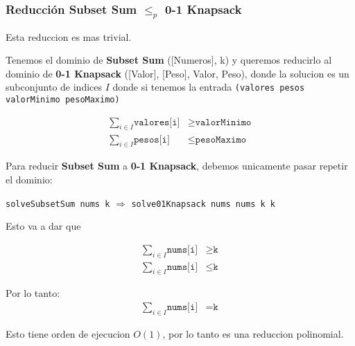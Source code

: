 \subsubsection*{Reducci\'on Subset Sum $\le_{p}$ 0-1 Knapsack}

Esta reduccion es mas trivial. 

Tenemos el dominio de \textbf{Subset Sum} ([Numeros], k) y queremos reducirlo 
al dominio de \textbf{0-1 Knapsack} ([Valor], [Peso], Valor, Peso), donde la solucion 
es un subconjunto de indices $I$ donde si tenemos la entrada
\texttt{(valores pesos valorMinimo pesoMaximo)}

\begin{align*}
  \sum_{i \in I} \texttt{valores[i]} &\geq \texttt{valorMinimo} \\
  \sum_{i \in I} \texttt{pesos[i]} &\le \texttt{pesoMaximo} 
\end{align*}

Para reducir \textbf{Subset Sum} a \textbf{0-1 Knapsack}, debemos unicamente 
pasar repetir el dominio: 

\begin{center}
  \texttt{solveSubsetSum nums k} $\Rightarrow$ 
  \texttt{solve01Knapsack nums nums k k}
\end{center}

Esto va a dar que  

\begin{align*}
  \sum_{i \in I} \texttt{nums[i]} &\geq \texttt{k} \\
  \sum_{i \in I} \texttt{nums[i]} &\le \texttt{k} 
\end{align*}

Por lo tanto: 
\begin{align*}
  \sum_{i \in I} \texttt{nums[i]} &= \texttt{k} 
\end{align*}

Esto tiene orden de ejecucion $O(1)$, por lo tanto es una reduccion polinomial. 


